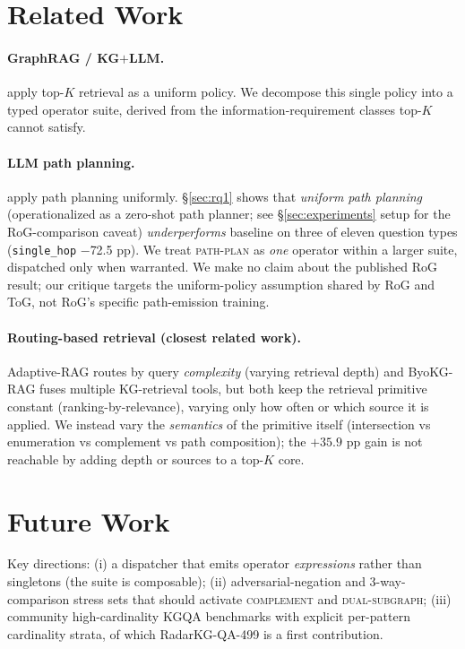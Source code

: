 \documentclass[10pt,a4paper,twocolumn]{article}
\newcommand{\qtype}[1]{\texttt{\small #1}}
\newcommand{\op}[1]{\textsc{\small #1}}
\begin{document}
\section{Related Work}
\label{sec:related}

\paragraph{GraphRAG / KG\texorpdfstring{$+$}{+}LLM.} \citet{edge2024graphrag,gutierrez2024hipporag,wang2024kgp,wen2024mindmap} apply top-$K$ retrieval as a uniform policy. We decompose this single policy into a typed operator suite, derived from the information-requirement classes top-$K$ cannot satisfy.

\paragraph{LLM path planning.} \citet{luo2024rog,sun2024tog,ma2025tog2} apply path planning uniformly. §\ref{sec:rq1} shows that \emph{uniform path planning} (operationalized as a zero-shot path planner; see §\ref{sec:experiments} setup for the RoG-comparison caveat) \emph{underperforms} baseline on three of eleven question types (\qtype{single\_hop} $-$72.5 pp). We treat \op{path-plan} as \emph{one} operator within a larger suite, dispatched only when warranted. We make no claim about the published RoG result; our critique targets the uniform-policy assumption shared by RoG and ToG, not RoG's specific path-emission training.

\paragraph{Routing-based retrieval (closest related work).} Adaptive-RAG \citep{jeong2024adaptiverag} routes by query \emph{complexity} (varying retrieval depth) and ByoKG-RAG \citep{byokgrag2025} fuses multiple KG-retrieval tools, but both keep the retrieval primitive constant (ranking-by-relevance), varying only how often or which source it is applied. We instead vary the \emph{semantics} of the primitive itself (intersection vs enumeration vs complement vs path composition); the $+35.9$ pp gain is not reachable by adding depth or sources to a top-$K$ core.

\section{Future Work}
\label{sec:future}
Key directions: (i) a dispatcher that emits operator \emph{expressions} rather than singletons (the suite is composable); (ii) adversarial-negation and 3-way-comparison stress sets that should activate \op{complement} and \op{dual-subgraph}; (iii) community high-cardinality KGQA benchmarks with explicit per-pattern cardinality strata, of which RadarKG-QA-499 is a first contribution.
\end{document}
